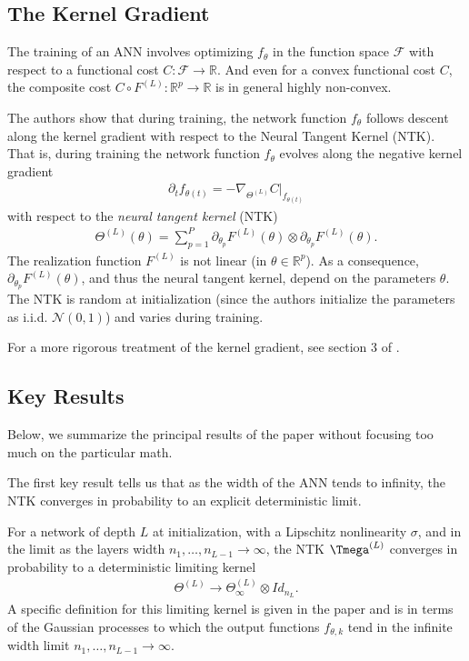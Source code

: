 \documentclass{article}
\newenvironment{manualtheorem}[1]{%
  \renewcommand\themanualtheoreminner{#1}%
  \manualtheoreminner
}{\endmanualtheoreminner}
\begin{document}
\subsection{The Kernel Gradient}
The training of an ANN involves optimizing $f_{\theta}$ in the function space $\mathcal{F}$ with respect to a functional cost $C: \mathcal{F} \rightarrow \mathbb{R}$. And even for a convex functional cost $C$, the composite cost $C \circ F^{(L)}: \mathbb{R}^p \rightarrow \mathbb{R}$ is in general highly non-convex. 

The authors show that during training, the network function $f_{\theta}$ follows descent along the kernel gradient with respect to the Neural Tangent Kernel (NTK). That is, during training the network function $f_{\theta}$ evolves along the negative kernel gradient
\begin{align*}
    \partial_t f_{\theta(t)} = - \nabla_{\Theta^{(L)}} C|_{f_{\theta(t)}}
\end{align*}
with respect to the \textit{neural tangent kernel} (NTK)
\begin{align*}
    \Theta^{(L)}(\theta) = \sum_{p=1}^P \partial_{\theta_p} F^{(L)}(\theta) \otimes \partial_{\theta_p} F^{(L)}(\theta).
\end{align*}
The realization function $F^{(L)}$ is not linear (in $\theta \in \mathbb{R}^p$). As a consequence, $\partial_{\theta_p} F^{(L)}(\theta)$, and thus the neural tangent kernel, depend on the parameters $\theta$. The NTK is random at initialization (since the authors initialize the parameters as i.i.d. $\mathcal{N}(0,1)$) and varies during training. 

For a more rigorous treatment of the kernel gradient, see section 3 of \cite{woodworth2020kernel}.

\subsection{Key Results}
Below, we summarize the principal results of the paper without focusing too much on the particular math. 

The first key result tells us that as the width of the ANN tends to infinity, the NTK converges in probability to an explicit deterministic limit.
\begin{manualtheorem}{1}
For a network of depth $L$ at initialization, with a Lipschitz nonlinearity $\sigma$, and in the limit as the layers width $n_1, \ldots, n_{L-1} \rightarrow \infty$, the NTK $\Tmega^{(L)}$ converges in probability to a deterministic limiting kernel
\begin{align*}
    \Theta^{(L)} \rightarrow \Theta_{\infty}^{(L)} \otimes Id_{n_L}.
\end{align*}
\end{manualtheorem}
A specific definition for this limiting kernel is given in the paper and is in terms of the Gaussian processes to which the output functions $f_{\theta, k}$ tend in the infinite width limit $n_1, \ldots, n_{L-1} \rightarrow \infty$.
\end{document}
